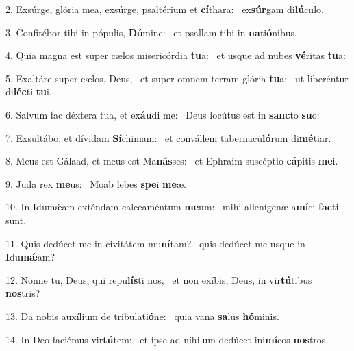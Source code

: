 2. Exsúrge, glória mea, exsúrge, psaltérium et \textbf{cí}thara: \ast\  ex\textbf{súr}gam di\textbf{lú}culo.\

3. Confitébor tibi in pópulis, \textbf{Dó}mine: \ast\  et psallam tibi in \textbf{na}ti\textbf{ó}nibus.\

4. Quia magna est super cælos misericórdia \textbf{tu}a: \ast\  et usque ad nubes \textbf{vé}ritas \textbf{tu}a:\

5. Exaltáre super cælos, Deus, \dag\  et super omnem terram glória \textbf{tu}a: \ast\  ut liberéntur di\textbf{léc}ti \textbf{tu}i.\

6. Salvum fac déxtera tua, et ex\textbf{áu}di me: \ast\  Deus locútus est in \textbf{sanc}to \textbf{su}o:\

7. Exsultábo, et dívidam \textbf{Sí}chimam: \ast\  et convállem tabernacu\textbf{ló}rum di\textbf{mé}tiar.\

8. Meus est Gálaad, et meus est Ma\textbf{nás}ses: \ast\  et Ephraim suscéptio \textbf{cá}pitis \textbf{me}i.\

9. Juda rex \textbf{me}us: \ast\  Moab lebes \textbf{spe}i \textbf{me}æ.\

10. In Idumǽam exténdam calceaméntum \textbf{me}um: \ast\  mihi alienígenæ a\textbf{mí}ci \textbf{fac}ti sunt.\

11. Quis dedúcet me in civitátem mu\textbf{ní}tam? \ast\  quis dedúcet me usque in \textbf{I}du\textbf{mǽ}am?\

12. Nonne tu, Deus, qui repu\textbf{lís}ti nos, \ast\  et non exíbis, Deus, in vir\textbf{tú}tibus \textbf{nos}tris?\

13. Da nobis auxílium de tribulati\textbf{ó}ne: \ast\  quia vana \textbf{sa}lus \textbf{hó}minis.\

14. In Deo faciémus vir\textbf{tú}tem: \ast\  et ipse ad níhilum dedúcet ini\textbf{mí}cos \textbf{nos}tros.\


